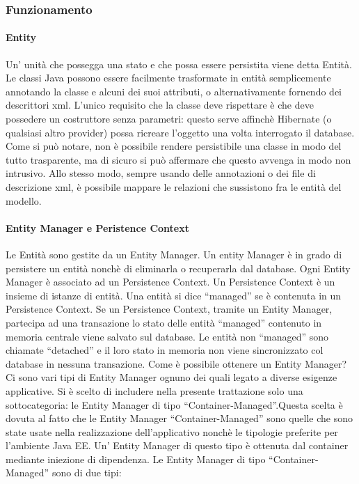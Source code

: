 \subsubsection{Funzionamento}
\paragraph{Entity}
Un' unità che possegga una stato e che possa essere persistita viene detta Entità. Le classi Java possono essere facilmente trasformate in entità semplicemente annotando la classe e alcuni dei suoi attributi, o alternativamente
fornendo dei descrittori xml. L'unico
requisito che la classe deve rispettare è che deve possedere un costruttore senza parametri: questo serve affinchè Hibernate (o qualsiasi altro provider) possa ricreare l'oggetto una volta interrogato il database. Come si può notare, 
non è possibile rendere persistibile una classe in modo del tutto trasparente, ma di sicuro si può affermare che questo avvenga in modo non intrusivo. Allo stesso modo, sempre usando delle annotazioni o dei file di descrizione xml, 
è possibile mappare le relazioni che sussistono fra le entità del modello.

\paragraph{Entity Manager e Peristence Context}
Le Entità sono gestite da un Entity Manager. Un entity Manager è in grado di persistere un entità nonchè di eliminarla o recuperarla dal database. Ogni Entity Manager è associato ad un Persistence Context. Un Persistence Context è un insieme di
istanze di entità. Una entità si dice ``managed'' se è contenuta in un Persistence Context. Se un Persistence Context, tramite un Entity Manager, partecipa ad una transazione lo stato delle entità ``managed'' contenuto in memoria
centrale viene salvato sul database. Le entità non ``managed'' sono chiamate ``detached'' e il loro stato in memoria non viene sincronizzato col database in nessuna transazione. Come è possibile ottenere un Entity Manager? Ci sono vari tipi
di Entity Manager ognuno dei quali legato a diverse esigenze applicative. Si è scelto di includere nella presente trattazione solo una sottocategoria: le Entity Manager di tipo ``Container-Managed''.Questa scelta è dovuta al fatto che
le Entity Manager ``Container-Managed'' sono quelle che sono state usate nella realizzazione dell'applicativo nonchè le tipologie preferite per l'ambiente Java EE. Un' Entity Manager di questo tipo è ottenuta dal container mediante iniezione
di dipendenza. Le Entity Manager di tipo ``Container-Managed'' sono di due tipi:

